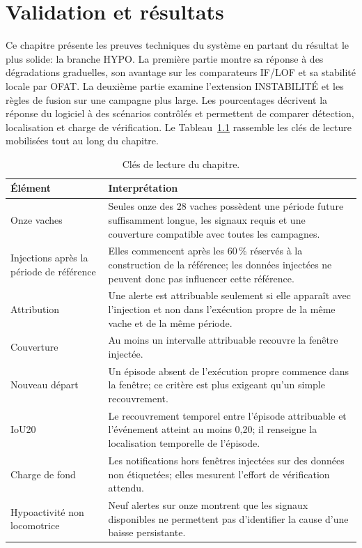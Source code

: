 \chapter{Validation et résultats}
\label{chapitre:validation}

Ce chapitre présente les preuves techniques du système en partant du résultat le plus solide:
la branche HYPO. La première partie montre sa réponse à des dégradations graduelles, son
avantage sur les comparateurs IF/LOF et sa stabilité locale par OFAT. La deuxième partie
examine l'extension INSTABILITÉ et les règles de fusion sur une campagne plus large. Les
pourcentages décrivent la réponse du logiciel à des scénarios contrôlés et permettent de
comparer détection, localisation et charge de vérification. Le Tableau~\ref{tab:cles_lecture_resultats}
rassemble les clés de lecture mobilisées tout au long du chapitre.

\begin{table}[H]
  \centering
  \caption{Clés de lecture du chapitre.}
  \label{tab:cles_lecture_resultats}
  \small
  \begin{tabular}{p{}p{}}
    \toprule
    Élément & Interprétation \\
    \midrule
    Onze vaches
      & Seules onze des 28 vaches possèdent une période future suffisamment longue, les signaux
        requis et une couverture compatible avec toutes les campagnes. \\
    Injections après la période de référence
      & Elles commencent après les 60\,\% réservés à la construction de la référence; les
        données injectées ne peuvent donc pas influencer cette référence. \\
    Attribution
      & Une alerte est attribuable seulement si elle apparaît avec l'injection et non dans
        l'exécution propre de la même vache et de la même période. \\
    Couverture
      & Au moins un intervalle attribuable recouvre la fenêtre injectée. \\
    Nouveau départ
      & Un épisode absent de l'exécution propre commence dans la fenêtre; ce critère est plus
        exigeant qu'un simple recouvrement. \\
    IoU20
      & Le recouvrement temporel entre l'épisode attribuable et l'événement atteint au moins
        0,20; il renseigne la localisation temporelle de l'épisode. \\
    Charge de fond
      & Les notifications hors fenêtres injectées sur des données non étiquetées; elles
        mesurent l'effort de vérification attendu. \\
    Hypoactivité non locomotrice
      & Neuf alertes sur onze montrent que les signaux disponibles ne permettent pas
        d'identifier la cause d'une baisse persistante. \\
    \bottomrule
  \end{tabular}
\end{table}

